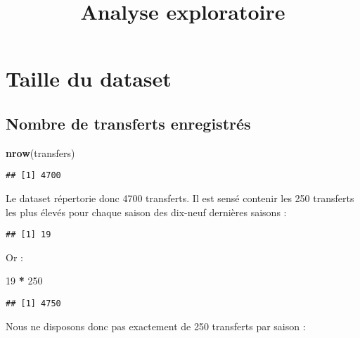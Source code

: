 \documentclass[]{article}
\title{Analyse exploratoire}
\author{}
\date{}
\newenvironment{Shaded}{\begin{snugshade}}{\end{snugshade}}
\newcommand{\DecValTok}[1]{\textcolor[rgb]{0.00,0.00,0.81}{#1}}
\newcommand{\KeywordTok}[1]{\textcolor[rgb]{0.13,0.29,0.53}{\textbf{#1}}}
\newcommand{\NormalTok}[1]{#1}
\newcommand{\OperatorTok}[1]{\textcolor[rgb]{0.81,0.36,0.00}{\textbf{#1}}}
\newcommand{\StringTok}[1]{\textcolor[rgb]{0.31,0.60,0.02}{#1}}
\begin{document}
\maketitle

\hypertarget{taille-du-dataset}{%
\section{Taille du dataset}\label{taille-du-dataset}}

\hypertarget{nombre-de-transferts-enregistres}{%
\subsection{Nombre de transferts
enregistrés}\label{nombre-de-transferts-enregistres}}

\begin{Shaded}
\begin{Highlighting}[]
\KeywordTok{nrow}\NormalTok{(transfers)}
\end{Highlighting}
\end{Shaded}

\begin{verbatim}
## [1] 4700
\end{verbatim}

Le dataset répertorie donc 4700 transferts. Il est sensé contenir les
250 transferts les plus élevés pour chaque saison des dix-neuf dernières
saisons :

\begin{Shaded}
\end{Shaded}

\begin{verbatim}
## [1] 19
\end{verbatim}

Or :

\begin{Shaded}
\begin{Highlighting}[]
\DecValTok{19} \OperatorTok{*}\StringTok{ }\DecValTok{250}
\end{Highlighting}
\end{Shaded}

\begin{verbatim}
## [1] 4750
\end{verbatim}

Nous ne disposons donc pas exactement de 250 transferts par saison :
\end{document}
